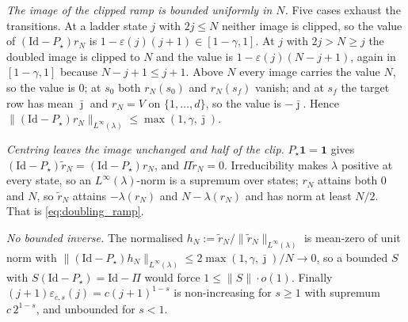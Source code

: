 \emph{The image of the clipped ramp is bounded uniformly in $N$.} Five cases exhaust the
transitions. At a ladder state $j$ with $2j\leq N$ neither image is clipped, so the value of
$(\mathrm{Id}-P_\star)r_N$ is $1-\varepsilon(j)(j+1)\in[1-\gamma,1]$. At $j$ with $2j>N\geq j$
the doubled image is clipped to $N$ and the value is $1-\varepsilon(j)(N-j+1)$, again in
$[1-\gamma,1]$ because $N-j+1\leq j+1$. Above $N$ every image carries the value $N$, so the
value is $0$; at $s_0$ both $r_N(s_0)$ and $r_N(s_f)$ vanish; and at $s_f$ the target row has
mean $\bar\jmath$ and $r_N=V$ on $\{1,\dots,d\}$, so the value is $-\bar\jmath$. Hence
$\|(\mathrm{Id}-P_\star)r_N\|_{L^\infty(\lambda)}\leq\max(1,\gamma,\bar\jmath)$.

\emph{Centring leaves the image unchanged and half of the clip.} $P_\star\mathbf 1=\mathbf 1$
gives $(\mathrm{Id}-P_\star)\tilde r_N=(\mathrm{Id}-P_\star)r_N$, and $\Pi\tilde r_N=0$.
Irreducibility makes $\lambda$ positive at every state, so an $L^\infty(\lambda)$-norm is a
supremum over states; $r_N$ attains both $0$ and $N$, so $\tilde r_N$ attains
$-\lambda(r_N)$ and $N-\lambda(r_N)$ and has norm at least $N/2$. That is
\eqref{eq:doubling_ramp}.

\emph{No bounded inverse.} The normalised $h_N:=\tilde r_N/\|\tilde r_N\|_{L^\infty(\lambda)}$
is mean-zero of unit norm with
$\|(\mathrm{Id}-P_\star)h_N\|_{L^\infty(\lambda)}\leq2\max(1,\gamma,\bar\jmath)/N\rightarrow0$,
so a bounded $S$ with $S(\mathrm{Id}-P_\star)=\mathrm{Id}-\Pi$ would force $1\leq\|S\|\cdot o(1)$.
Finally $(j+1)\varepsilon_{c,s}(j)=c(j+1)^{1-s}$ is non-increasing for $s\geq1$ with supremum
$c\,2^{1-s}$, and unbounded for $s<1$.
